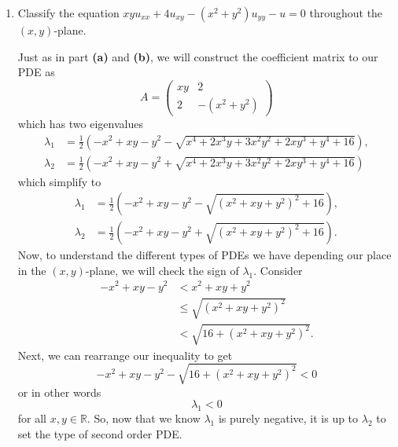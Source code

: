 \documentclass[a4paper,12pt]{article}
\newcommand{\reals}{\mathbb{R}}
\newcommand{\pmat}[1]{\begin{pmatrix} #1 \end{pmatrix}}
\begin{document}
\begin{enumerate}[label = \textbf{(\alph*)}]
            \item Classify the equation $ xyu_{xx} + 4u_{xy} - (x^2 + y^2)u_{yy} - u = 0 $ throughout the $ (x,y) $-plane.
            
            Just as in part \textbf{(a)} and \textbf{(b)}, we will construct the coefficient matrix to our PDE as
            \[
                A =
                \pmat{
                    xy & 2 \\
                    2 & -(x^2 + y^2)
                }
            \]
            which has two eigenvalues
            \begin{align*}
                \lambda_1 &= \frac{1}{2} \left(-x^2 + x y - y^2 -  \sqrt{x^4+2 x^3 y+3 x^2 y^2+2 x y^3+y^4+16}\right), \\
                \lambda_2 &= \frac{1}{2} \left(-x^2 + x y - y^2 + \sqrt{x^4+2 x^3 y+3 x^2 y^2+2 x y^3+y^4+16}\right)
            \end{align*}
            which simplify to
            \begin{align*}
                \lambda_1 &= \frac{1}{2} \left(-x^2 + x y - y^2 - \sqrt{\left(x^2+x y+y^2\right)^2+16} \right), \\
                \lambda_2 &= \frac{1}{2} \left(-x^2 + x y - y^2 + \sqrt{\left(x^2+x y+y^2\right)^2+16} \right).
            \end{align*}
            Now, to understand the different types of PDEs we have depending our place in the $ (x,y) $-plane, we will check the sign of $ \lambda_1 $. Consider
            \begin{align*}
                -x^2 + xy - y^2 &< x^2 + xy + y^2 \\
                &\leq \sqrt{(x^2 + xy + y^2)^2} \\
                &< \sqrt{16 + (x^2 + xy + y^2)^2}.
            \end{align*}
            Next, we can rearrange our inequality to get
            \[
                -x^2 + xy - y^2 - \sqrt{16 + (x^2 + xy + y^2)^2} < 0
            \]
            or in other words
            \[
                \lambda_1 < 0
            \]
            for all $ x,y \in \reals $. So, now that we know $ \lambda_1 $ is purely negative, it is up to $ \lambda_2 $ to set the type of second order PDE. 
            

\end{enumerate}
\end{document}

